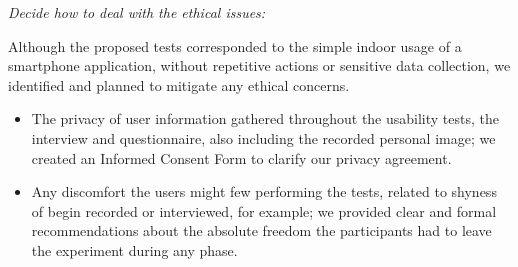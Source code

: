



\emph{Decide how to deal with the ethical issues:}

Although the proposed tests corresponded to the simple indoor usage of a smartphone application, without repetitive actions or sensitive data collection, we identified and planned to mitigate any ethical concerns.

\begin{itemize}
    \item The privacy of user information gathered throughout the usability tests, the interview and questionnaire, also including the recorded personal image; we created an Informed Consent Form to clarify our privacy agreement.

    \item Any discomfort the users might few performing the tests, related to shyness of begin recorded or interviewed, for example; we provided clear and formal recommendations about the absolute freedom the participants had to leave the experiment during any phase.
\end{itemize}

